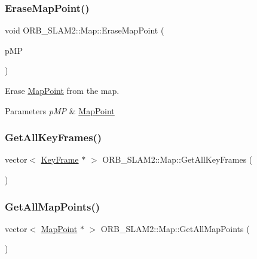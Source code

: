 \subsubsection{\texorpdfstring{Erase\+Map\+Point()}{EraseMapPoint()}}
{\footnotesize\ttfamily void O\+R\+B\+\_\+\+S\+L\+A\+M2\+::\+Map\+::\+Erase\+Map\+Point (\begin{DoxyParamCaption}\item[{\mbox{\hyperlink{class_o_r_b___s_l_a_m2_1_1_map_point}{Map\+Point}} $\ast$}]{p\+MP }\end{DoxyParamCaption})}



Erase \mbox{\hyperlink{class_o_r_b___s_l_a_m2_1_1_map_point}{Map\+Point}} from the map. 


\begin{DoxyParams}{Parameters}
{\em p\+MP} & \mbox{\hyperlink{class_o_r_b___s_l_a_m2_1_1_map_point}{Map\+Point}} \\
\hline
\end{DoxyParams}
\mbox{\label{class_o_r_b___s_l_a_m2_1_1_map_a8cde12cda887a0eb1e24975f4e734592}} 
\subsubsection{\texorpdfstring{Get\+All\+Key\+Frames()}{GetAllKeyFrames()}}
{\footnotesize\ttfamily vector$<$ \mbox{\hyperlink{class_o_r_b___s_l_a_m2_1_1_key_frame}{Key\+Frame}} $\ast$ $>$ O\+R\+B\+\_\+\+S\+L\+A\+M2\+::\+Map\+::\+Get\+All\+Key\+Frames (\begin{DoxyParamCaption}{ }\end{DoxyParamCaption})}

\mbox{\label{class_o_r_b___s_l_a_m2_1_1_map_a09f346e647d3d36ec644f96d878b0c9b}} 
\subsubsection{\texorpdfstring{Get\+All\+Map\+Points()}{GetAllMapPoints()}}
{\footnotesize\ttfamily vector$<$ \mbox{\hyperlink{class_o_r_b___s_l_a_m2_1_1_map_point}{Map\+Point}} $\ast$ $>$ O\+R\+B\+\_\+\+S\+L\+A\+M2\+::\+Map\+::\+Get\+All\+Map\+Points (\begin{DoxyParamCaption}{ }\end{DoxyParamCaption})}

